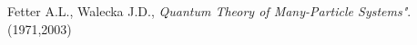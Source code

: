 
\cleardoublepage
{}
\begin{thebibliography}{99}


Fetter A.L., Walecka J.D., 
\textit{Quantum Theory of Many-Particle Systems"}.
(1971,2003)


 

%

\end{thebibliography}